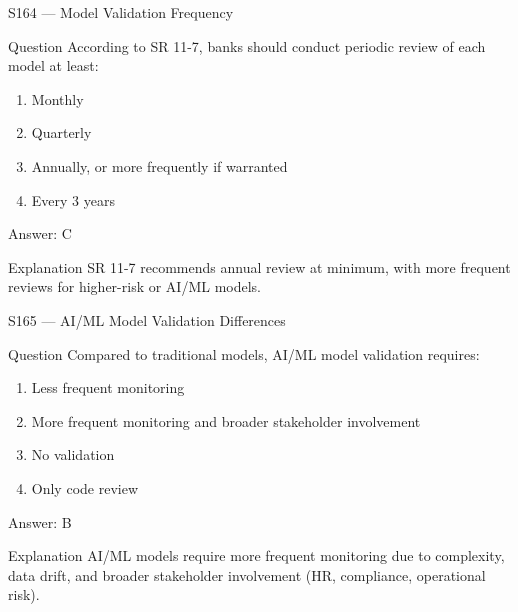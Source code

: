 \documentclass[aspectratio=169,8pt]{beamer}
\begin{document}
	\begin{frame}{S164 --- Model Validation Frequency}
		\begin{block}{Question}
			According to SR 11-7, banks should conduct periodic review of each model at least:
			\begin{enumerate}
				\item Monthly
				\item Quarterly
				\item Annually, or more frequently if warranted
				\item Every 3 years
			\end{enumerate}
		\end{block}
		\begin{exampleblock}{Answer: C}\end{exampleblock}
		\begin{block}{Explanation}
			SR 11-7 recommends annual review at minimum, with more frequent reviews for higher-risk or AI/ML models.
		\end{block}
	\end{frame}
	
	\begin{frame}{S165 --- AI/ML Model Validation Differences}
		\begin{block}{Question}
			Compared to traditional models, AI/ML model validation requires:
			\begin{enumerate}
				\item Less frequent monitoring
				\item More frequent monitoring and broader stakeholder involvement
				\item No validation
				\item Only code review
			\end{enumerate}
		\end{block}
		\begin{exampleblock}{Answer: B}\end{exampleblock}
		\begin{block}{Explanation}
			AI/ML models require more frequent monitoring due to complexity, data drift, and broader stakeholder involvement (HR, compliance, operational risk).
		\end{block}
	\end{frame}
	
\end{document}

